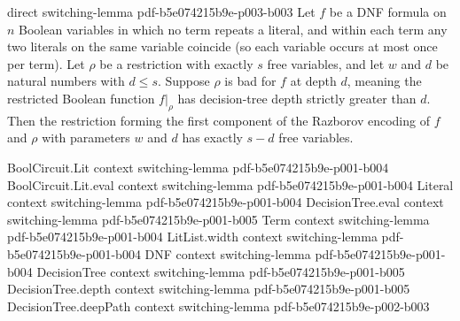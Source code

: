 \begin{lemma}
  {direct}
  {switching-lemma}
  {pdf-b5e074215b9e-p003-b003}
Let $f$ be a DNF formula on $n$ Boolean variables in which no term repeats a literal,
and within each term any two literals on the same variable coincide (so each variable
occurs at most once per term). Let $\rho$ be a restriction with exactly $s$ free
variables, and let $w$ and $d$ be natural numbers with $d \le s$. Suppose $\rho$ is bad
for $f$ at depth $d$, meaning the restricted Boolean function $f|_\rho$ has
decision-tree depth strictly greater than $d$. Then the restriction forming the first
component of the Razborov encoding of $f$ and $\rho$ with parameters $w$ and $d$ has
exactly $s - d$ free variables.
\end{lemma}

\begin{lemma}
\label{SwitchingLemma.bad_count_bound}
\leanok
{}
\proofstep
  {BoolCircuit.Lit}
  {context}
  {switching-lemma}
  {pdf-b5e074215b9e-p001-b004}
\proofstep
  {BoolCircuit.Lit.eval}
  {context}
  {switching-lemma}
  {pdf-b5e074215b9e-p001-b004}
\proofstep
  {Literal}
  {context}
  {switching-lemma}
  {pdf-b5e074215b9e-p001-b004}
\proofstep
  {DecisionTree.eval}
  {context}
  {switching-lemma}
  {pdf-b5e074215b9e-p001-b005}
\proofstep
  {Term}
  {context}
  {switching-lemma}
  {pdf-b5e074215b9e-p001-b004}
\proofstep
  {LitList.width}
  {context}
  {switching-lemma}
  {pdf-b5e074215b9e-p001-b004}
\proofstep
  {DNF}
  {context}
  {switching-lemma}
  {pdf-b5e074215b9e-p001-b004}
\proofstep
  {DecisionTree}
  {context}
  {switching-lemma}
  {pdf-b5e074215b9e-p001-b005}
\proofstep
  {DecisionTree.depth}
  {context}
  {switching-lemma}
  {pdf-b5e074215b9e-p001-b005}
\proofstep
  {DecisionTree.deepPath}
  {context}
  {switching-lemma}
  {pdf-b5e074215b9e-p002-b003}

\end{lemma}
